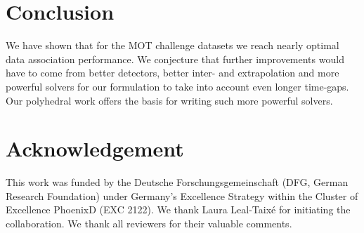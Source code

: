 \documentclass{article}
\begin{document}
 \section{Conclusion}
\label{sec:conclusion}
We have shown that for the MOT challenge datasets we reach nearly optimal data association performance.
We conjecture that further improvements would have to come from better detectors, better inter- and extrapolation and more powerful solvers for our formulation to take into account even longer time-gaps.
Our polyhedral work offers the basis for writing such more powerful solvers.


 \section{Acknowledgement}
\label{sec:acknowledgement}
This work was funded by the Deutsche Forschungsgemeinschaft (DFG, German Research Foundation) under Germany's Excellence Strategy within the Cluster of Excellence PhoenixD (EXC 2122). We thank Laura Leal-Taix{\'e} for initiating the collaboration. We thank all reviewers for their valuable comments.  
\clearpage 
\newpage



\setcounter{@affiliationcounter}{2}

\clearpage
\newpage
{}
\printAffiliationsAndNotice{\icmlEqualContribution} 
\end{document}
